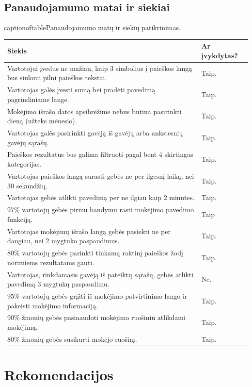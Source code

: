 \documentclass[oneside]{VUMIFPSkursinis}
\begin{document}
\subsection{Panaudojamumo matai ir siekiai}
\begin{center}
	captionof{table}{Panaudojamumo matų ir siekių patikrinimas.}
    \begin{tabular}{ |p{12cm}| p{3cm} |}
    \hline
	Siekis & Ar įvykdytas? \\ \hline
	Vartotojui įvedus ne mažiau, kaip 3 simbolius į paieškos langą bus siūlomi pilni paieškos tekstai. & Taip. \\ \hline
	Vartotojas galės įvesti sumą bei pradėti pavedimą pagrindiniame lange. & Taip. \\ \hline
	Mokėjimo išrašo datos apsibrėžime nebus būtina pasirinkti dieną (užteks mėnesio). & Taip. \\ \hline
	Vartotojas galės pasirinkti gavėją iš gavėjų arba ankstesnių gavėjų sąrašų. & Taip. \\ \hline
	Paieškos rezultatus bus galima filtruoti pagal bent 4 skirtingas kategorijas. & Taip. \\ \hline
	Vartotojas paieškos langą surasti gebės ne per ilgesnį laiką, nei 30 sekundžių. & Taip. \\ \hline
	Vartotojas gebės atlikti pavedimą per ne ilgiau kaip 2 minutes. & Taip. \\ \hline
	97\% vartotojų gebės pirmu bandymu rasti mokėjimo pavedimo funkciją. & Taip \\ \hline
	Vartotojas mokėjimų išrašo langą gebės pasiekti ne per daugiau, nei 2 mygtuko paspaudimus. & Taip. \\ \hline
	80\% vartotojų gebės parinkti tinkamą raktinį paieškos žodį norimiems rezultatams gauti. & Taip. \\ \hline
	Vartotojas, rinkdamasis gavėją iš pateiktų sąrašų, gebės atlikti pavedimą 3 mygtukų paspaudimu. & Ne. \\ \hline
	95\% vartotojų gebės grįžti iš mokėjimo patvirtinimo lango ir pakeisti mokėjimo informaciją. & Taip. \\ \hline
	90\% žmonių gebės pasinaudoti mokėjimo ruošiniu atlikdami mokėjimą. & Taip. \\ \hline
	80\% žmonių gebės susikurti mokėjo ruošinį. & Taip. \\ \hline

    \end{tabular}
\end{center}
\section{Rekomendacijos}
\end{document}
